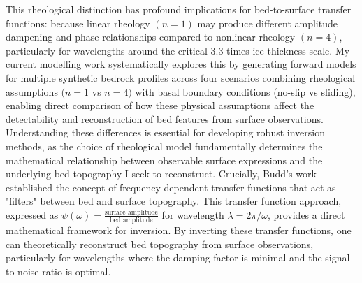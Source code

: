 This rheological distinction has profound implications for bed-to-surface transfer functions: because linear rheology $(n = 1)$ may produce different amplitude dampening and phase relationships compared to nonlinear rheology $(n = 4)$, particularly for wavelengths around the critical 3.3 times ice thickness scale.
My current modelling work systematically explores this by generating forward models for multiple synthetic bedrock profiles across four scenarios combining rheological assumptions $(n = 1$ vs $n = 4)$ with basal boundary conditions (no-slip vs sliding), enabling direct comparison of how these physical assumptions affect the detectability and reconstruction of bed features from surface observations. Understanding these differences is essential for developing robust inversion methods, as the choice of rheological model fundamentally determines the mathematical relationship between observable surface expressions and the underlying bed topography I seek to reconstruct.
Crucially, Budd's work established the concept of frequency-dependent transfer functions that act as "filters" between bed and surface topography. This transfer function approach, expressed as $\psi(\omega) = \frac{\text{surface amplitude}}{\text{bed amplitude}}$ for wavelength $\lambda = 2\pi/\omega$, provides a direct mathematical framework for inversion. By inverting these transfer functions, one can theoretically reconstruct bed topography from surface observations, particularly for wavelengths where the damping factor is minimal and the signal-to-noise ratio is optimal.

